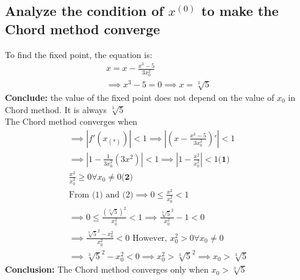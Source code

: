 \subsection{Analyze the condition of $x^{(0)}$ to make the Chord method converge}
To find the fixed point, the equation is:
\begin{align*}
    x = x - \frac{x^{3} - 5}{3x_0^2} \\
    \implies x^{3} - 5 = 0
    \implies x = \sqrt[3]{5}
\end{align*}
\textbf{Conclude:} the value of the fixed point does not depend on the value of $x_0$ in Chord method. It is always $\sqrt[3]{5}$ \\
The Chord method converges when
\begin{align*}
    \implies |f'(x_(*))| < 1
    \implies |(x - \frac{x^{3} - 5}{3x_0^2})'| < 1  \\
    \implies |1 - \frac{1}{3x_0^2}(3x^2)| < 1 
    \implies |1 - \frac{x^2}{x_0^2}| < 1 \textbf{(1)}\\
    \frac{x^2}{x_0^2} \ge 0 \forall x_0 \neq 0 \textbf{(2)}\\
    \text{From (1) and (2)}\implies 0 \le \frac{x^{2}}{x_0^2} < 1 \\
    \implies 0 \le \frac{(\sqrt[3]{5})^2}{x_0^2} < 1 
    \implies \frac{\sqrt[3]{5}^{2}}{x_0^2} - 1 < 0 \\
\implies \frac{\sqrt[3]{5}^{2}-x_0^2}{x_0^2} < 0 \text{ However, } x_0^2 > 0 \forall x_0 \neq 0 \\
    \implies \sqrt[3]{5}^2 - x_0^2 < 0
    \implies x_0^2 > \sqrt[3]{5}^2
    \implies x_0 > \sqrt[3]{5}
\end{align*}
\textbf{Conclusion:} The Chord method converges only when $x_0 > \sqrt[3]{5}$
\newpage
